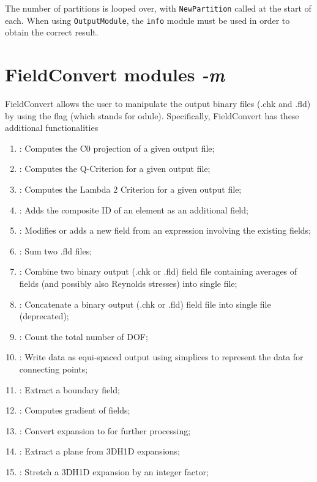 The number of partitions is looped over, with \verb+NewPartition+ called at
the start of each. When using \verb+OutputModule+, the \verb+info+ module
must be used in order to obtain the correct result.

\section{FieldConvert modules \textit{-m}}
FieldConvert allows the user to manipulate the \nekpp output
binary files (.chk and .fld) by using the flag  (which
stands for odule).
Specifically, FieldConvert has these additional functionalities
%
\begin{enumerate}
\item {}: Computes the C0 projection of a given output file;
\item {}: Computes the Q-Criterion for a given output file;
\item {}: Computes the Lambda 2 Criterion for a given output file;
\item {}: Adds the composite ID of an element as an additional field;
\item {}: Modifies or adds a new field from an expression involving the existing fields;
\item {}: Sum two .fld files;
\item {}: Combine two \nekpp binary output (.chk or .fld) field file containing averages of fields (and
possibly also Reynolds stresses) into single file;
\item {}: Concatenate a \nekpp binary output (.chk or .fld) field file into single file (deprecated);
\item {}: Count the total number of DOF;
\item {}: Write data as equi-spaced output using simplices to represent the data for connecting points;
\item {}: Extract a boundary field;
\item {}: Computes gradient of fields;
\item {}: Convert  expansion to  for further processing;
\item {}: Extract a plane from 3DH1D expansions;
\item {}: Stretch a 3DH1D expansion by an integer factor;

\end{enumerate}
